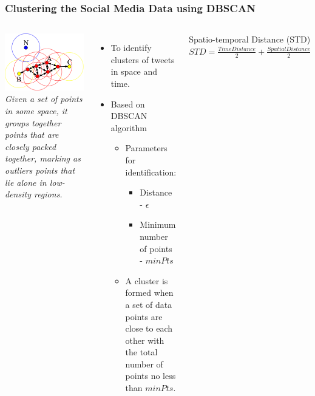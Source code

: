 \begin{frame}
    \frametitle{Clustering the Social Media Data using DBSCAN}
    \begin{columns}
             \centering
             \includegraphics[width=\textwidth]{resource/figures/dbscan.png}\\
              \tiny \textit{Given a set of points in some space, it groups together points that are closely packed together, marking as outliers points that lie alone in low-density regions.}
              \begin{itemize}
                  \item To identify clusters of tweets in space and time.
                  \item Based on DBSCAN algorithm
                  \begin{itemize}
                      \item Parameters for identification:
                      \begin{itemize}
                          \item Distance - $\epsilon$
                          \item Minimum number of points - $minPts$
                      \end{itemize}
                      \item A cluster is formed when a set of data points are close to each other with the total number of points no less than $minPts$.
                  \end{itemize}
              \end{itemize}
              \begin{block}{Spatio-temporal Distance (STD)}
                $STD = \frac{TimeDistance}{2} + \frac{SpatialDistance}{2}$
              \end{block}
    \end{columns} 
\end{frame}

